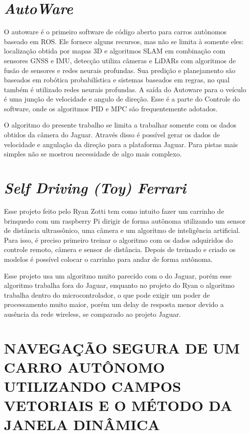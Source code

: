 \section{\textit{AutoWare}}
\label{AutoWare}

O autoware é o primeiro software de código aberto para carros autônomos baseado em ROS. Ele fornece alguns recursos, mas não se limita à somente eles: localização obtida por mapas 3D e algoritmos SLAM em combinação com sensores GNSS e IMU, detecção utiliza câmeras e LiDARs com algoritmos de fusão de sensores e redes neurais profundas. Sua predição e planejamento são baseados em robótica probabilística e sistemas baseados em regras, no qual também é utilizado redes neurais profundas. A saída do Autoware para o veículo é uma junção de velocidade e angulo de direção. Esse é a parte do Controle do software, onde os algoritmos PID e MPC são frequentemente adotados. \cite{autoware}

O algoritmo do presente trabalho se limita a trabalhar somente com os dados obtidos da câmera do Jaguar. Através disso é possível gerar os dados de velocidade e angulação da direção para a plataforma Jaguar. Para pistas mais simples não se mostrou necessidade de algo mais complexo.

\section{\textit{Self Driving (Toy) Ferrari}}
\label{Self_Driving_(Toy)_Ferrari}

Esse projeto feito pelo Ryan Zotti tem como intuito fazer um carrinho de brinquedo com um raspberry Pi dirigir de forma autônoma utilizando um sensor de distância ultrassônico, uma câmera e um algoritmo de inteligência artificial. Para isso, é preciso primeiro treinar o algoritmo com os dados adquiridos do controle remoto, câmera e sensor de distância. Depois de treinado e criado os modelos é possível colocar o carrinho para andar de forma autônoma. \cite{selfdrivingcartoy}

Esse projeto usa um algoritmo muito parecido com o do Jaguar, porém esse algoritmo trabalha fora do Jaguar, enquanto no projeto do Ryan o algoritmo trabalha dentro do microcontrolador, o que pode exigir um poder de processamento muito maior, porém um delay de resposta menor devido a ausência da rede wireless, se comparado ao projeto Jaguar.

\section{NAVEGAÇÃO SEGURA DE UM CARRO AUTÔNOMO UTILIZANDO CAMPOS VETORIAIS E O MÉTODO DA JANELA DINÂMICA}
\label{NAVEGAÇÃO_SEGURA}

